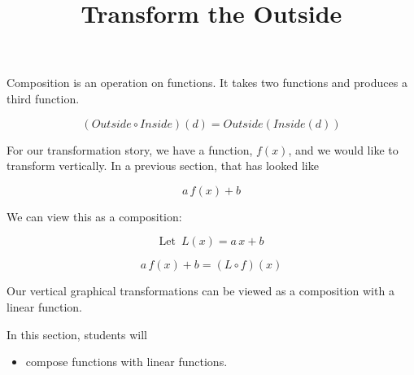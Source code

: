 \documentclass{ximera}
\title{Transform the Outside}
\begin{document}
\begin{abstract}
\end{abstract}
\maketitle









Composition is an operation on functions.  It takes two functions and produces a third function.


\[  (Outside \circ Inside)(d) = Outside(Inside(d))    \]


For our transformation story, we have a function, $f(x)$, and we would like to transform vertically.  In a previous section, that has looked like


\[   a \, f(x) + b  \]


We can view this as a composition:


\[  \text{Let } \, L(x) = a \, x + b   \]


\[   a \, f(x) + b  = (L \circ f)(x)\]



Our vertical graphical transformations can be viewed as a composition with a linear function.





\begin{sectionOutcomes}
In this section, students will 

\begin{itemize}
\item compose functions with linear functions.
\end{itemize}
\end{sectionOutcomes}
\end{document}
